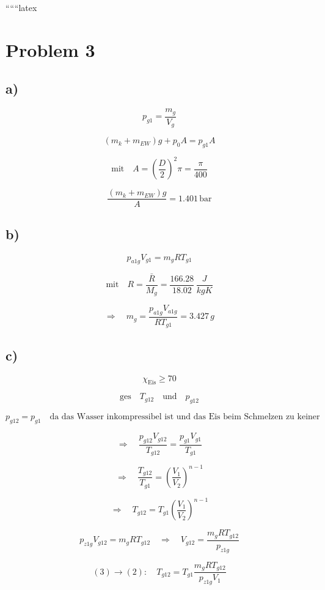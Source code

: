 
``````latex


\section*{Problem 3}

\subsection*{a)}

\[
p_{g1} = \frac{m_g}{V_g}
\]

\[
(m_k + m_{EW})g + p_0 A = p_{g1} A \tag{1}
\]

\[
\text{mit} \quad A = \left(\frac{D}{2}\right)^2 \pi = \frac{\pi}{400}
\]

\[
\frac{(m_k + m_{EW})g}{A} = 1.401 \, \text{bar}
\]

\subsection*{b)}

\[
p_{a1g} V_{g1} = m_g R T_{g1}
\]

\[
\text{mit} \quad R = \frac{\bar{R}}{M_g} = \frac{166.28}{18.02} \, \frac{J}{kgK}
\]

\[
\Rightarrow \quad m_g = \frac{p_{a1g} V_{a1g}}{R T_{g1}} = 3.427 \, g
\]

\subsection*{c)}

\[
\chi_{\text{Eis}} \geq 70
\]

\[
\text{ges} \quad T_{g12} \quad \text{und} \quad p_{g12}
\]

\[
p_{g12} = p_{g1} \quad \text{da das Wasser inkompressibel ist und das Eis beim Schmelzen zu keiner Volumenänderung führt. Das EW ist also isochor und die Gleichung (1) aus a) ist die selbe für b).}
\]

\[
\Rightarrow \quad \frac{p_{g12} V_{g12}}{T_{g12}} = \frac{p_{g1} V_{g1}}{T_{g1}}
\]

\[
\Rightarrow \quad \frac{T_{g12}}{T_{g1}} = \left(\frac{V_1}{V_2}\right)^{n-1}
\]

\[
\Rightarrow \quad T_{g12} = T_{g1} \left(\frac{V_1}{V_2}\right)^{n-1} \tag{2}
\]

\[
p_{z1g} V_{g12} = m_g R T_{g12} \quad \Rightarrow \quad V_{g12} = \frac{m_g R T_{g12}}{p_{z1g}} \tag{3}
\]

\[
(3) \rightarrow (2): \quad T_{g12} = T_{g1} \frac{m_g R T_{g12}}{p_{z1g} V_1}
\]


